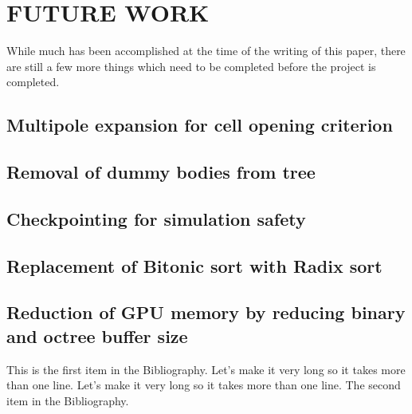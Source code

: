 \documentclass{thesis}
\begin{document}
\chapter{FUTURE WORK}
While much has been accomplished at the time of the writing of this paper, there are still a few more things which need to be completed before the project is completed.

\section{Multipole expansion for cell opening criterion}
\section{Removal of dummy bodies from tree}
\section{Checkpointing for simulation safety}
\section{Replacement of Bitonic sort with Radix sort}
\section{Reduction of GPU memory by reducing binary and octree buffer size}


\begin{singlespace}
\begin{thebibliography}{99}
 This is the first item in the Bibliography.
Let's make it very long so it takes more than one line.
Let's make it very long so it takes more than one line.
 The second item in the Bibliography.
\end{thebibliography}
\end{singlespace}

\appendix    %
\end{document}
